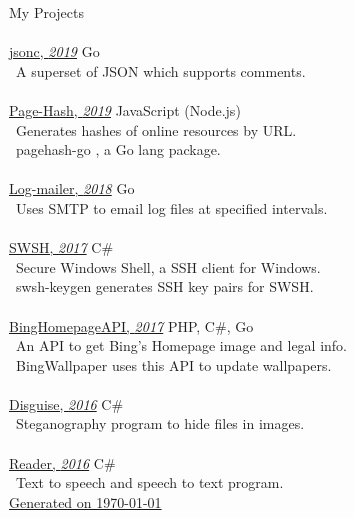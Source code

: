 \documentclass[12pt, a4paper]{article}
\def\icon#1{\color{icon}{#1}\color{text}}
\def\github{\icon{\FA \faGithub}}
\def\p#1{\textbullet \ #1}
\def\subheading#1{\color{subheading}\large #1 \normalsize \dotfill}
\def\gitlinkc#1#2{\href{https://github.com/#1}{#2}}
\def\gitlink#1{ \gitlinkc{#1}{\github}}
\def\project#1#2#3{\href{https://#3/?ref=resume}{#1, \itshape#2\normalfont}}
\def\lang#1{\hfill #1\normalfont}
\begin{document}
    \subheading{My Projects}\\
    \color{text}\\
    \project{jsonc}{2019}{}\gitlink{muhammadmuzzammil1998/jsonc} \lang{Go}\\
    \p{A superset of JSON which supports comments.}\\
    \\
    \project{Page-Hash}{2019}{pagehash.muzzammil.xyz}\gitlink{muhammadmuzzammil1998/Page-Hash} \lang{JavaScript (Node.js)}\\
    \p{Generates hashes of online resources by URL.}\\
    \p{pagehash-go\gitlink{muhammadmuzzammil1998/pagehash-go}, a Go lang package.}\\
    \\
    \project{Log-mailer}{2018}{}\gitlink{muhammadmuzzammil1998/Log-mailer} \lang{Go}\\
    \p{Uses SMTP to email log files at specified intervals.}\\
    \\
    \project{SWSH}{2017}{swsh.muzzammil.xyz}\gitlink{SecureWindowsShell/SWSH} \lang{C\#}\\
    \p{Secure Windows Shell, a SSH client for Windows.}\\
    \p{swsh-keygen\gitlink{SecureWindowsShell/swsh-keygen} generates SSH key pairs for SWSH.}\\
    \\
    \project{BingHomepageAPI}{2017}{git.muzzammil.xyz/bing}\gitlink{BingHomepage/BingHomepageAPI} \lang{PHP, C\#, Go}\\
    \p{An API to get Bing's Homepage image and legal info.}\\
    \p{BingWallpaper\gitlink{BingHomepage?q=BingWallpaper} uses this API to update wallpapers.}\\
    \\
    \project{Disguise}{2016}{disguise.muzzammil.xyz} \lang{C\#}\\
    \p{Steganography program to hide files in images.}\\
    \\
    \project{Reader}{2016}{reader.muzzammil.xyz} \lang{C\#}\\
    \p{Text to speech and speech to text program.}\\
    \gitlinkc{muhammadmuzzammil1998/Resume}{\tiny{Generated on \today}}
\end{document}
